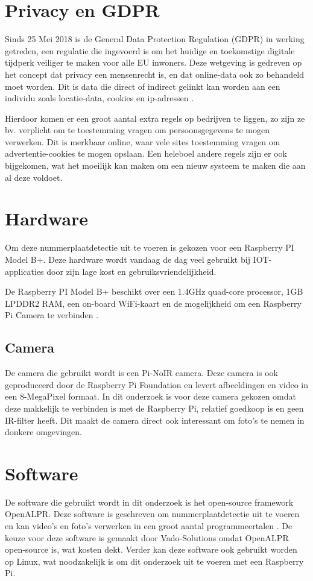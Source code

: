 \section{Privacy en GDPR}
\label{sec:privacy-en-gdpr}

Sinds 25 Mei 2018 is de General Data Protection Regulation (GDPR) in werking getreden, een regulatie die ingevoerd is om het huidige en toekomstige digitale tijdperk veiliger te maken voor alle EU inwoners.
Deze wetgeving is gedreven op het concept dat privacy een mensenrecht is, en dat online-data ook zo behandeld moet worden. Dit is data die direct of indirect gelinkt kan worden aan een individu zoals locatie-data, cookies en ip-adressen \autocite{goddard2017eu}.

Hierdoor komen er een groot aantal extra regels op bedrijven te liggen, zo zijn ze bv. verplicht om te toestemming vragen om persoonsgegevens te mogen verwerken. Dit is merkbaar online, waar vele sites toestemming vragen om advertentie-cookies te mogen opslaan. Een heleboel andere regels zijn er ook bijgekomen, wat het moeilijk kan maken om een nieuw systeem te maken die aan al deze voldoet.

\section{Hardware}
Om deze nummerplaatdetectie uit te voeren is gekozen voor een Raspberry PI Model B+. Deze hardware wordt vandaag de dag veel gebruikt bij IOT-applicaties door zijn lage kost en gebruiksvriendelijkheid.  

De Raspberry PI Model B+ beschikt over een 1.4GHz quad-core processor, 1GB LPDDR2 RAM, een on-board WiFi-kaart en de mogelijkheid om een Raspberry Pi Camera te verbinden \autocite{raspberrypisitemodelbplus} .

\subsection{Camera}
De camera die gebruikt wordt is een Pi-NoIR camera. Deze camera is ook geproduceerd door de Raspberry Pi Foundation en levert afbeeldingen en video in een 8-MegaPixel formaat. In dit onderzoek is voor deze camera gekozen omdat deze makkelijk te verbinden is met de Raspberry Pi, relatief goedkoop is en geen IR-filter heeft. Dit maakt de camera direct ook interessant om foto's te nemen in donkere omgevingen. \autocite{raspberrypisitemodelpinoir}

\section{Software}
De software die gebruikt wordt in dit onderzoek is het open-source framework OpenALPR. Deze software is geschreven om nummerplaatdetectie uit te voeren en kan video's en foto's verwerken in een groot aantal programmeertalen \autocite{openalprgithub}. De keuze voor deze software is gemaakt door Vado-Solutions omdat OpenALPR open-source is, wat kosten dekt. Verder kan deze software ook gebruikt worden op Linux, wat noodzakelijk is om dit onderzoek uit te voeren met een Raspberry Pi.